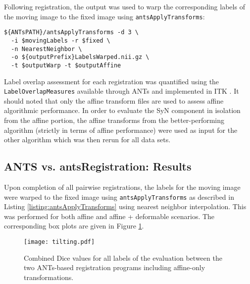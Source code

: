 \documentclass[final,5p,times,twocolumn]{elsarticle}
\begin{document}
Following registration, the output was used
to warp the corresponding labels of the moving
image to the fixed image using \verb#antsApplyTransforms#:

\begin{lstlisting}  
${ANTsPATH}/antsApplyTransforms -d 3 \
  -i $movingLabels -r $fixed \
  -n NearestNeighbor \
  -o ${outputPrefix}LabelsWarped.nii.gz \
  -t $outputWarp -t $outputAffine
\end{lstlisting}
Label overlap assessment for each registration was quantified
using the \verb#LabelOverlapMeasures# available through ANTs and 
implemented in ITK \cite{tustison2009}.
It should noted that only the affine transform files are used
to assess affine algorithmic performance. In order to evaluate
the SyN component in isolation from the affine portion, the 
affine transforms from the better-performing algorithm (strictly
in terms of affine performance) were used as input for the other
algorithm which was then rerun for all data sets. 

\subsection{ANTS vs. antsRegistration:  Results}

Upon completion of all pairwise registrations, the labels for the
moving image were warped to the fixed image using \verb#antsApplyTransforms#
as described in Listing \ref{listing:antsApplyTransforms} using 
nearest neighbor interpolation.  This was performed 
for both affine and affine + deformable scenarios.  The
corresponding box plots are given in Figure \ref{fig:results}. 

\begin{center}
\begin{figure}
  \texttt{[image: tilting.pdf]}
  \caption{Combined Dice values for all labels of the evaluation between the two ANTs-based registration programs including affine-only transformations.
  }
  \label{fig:results}
\end{figure}
\end{center}
\end{document}
